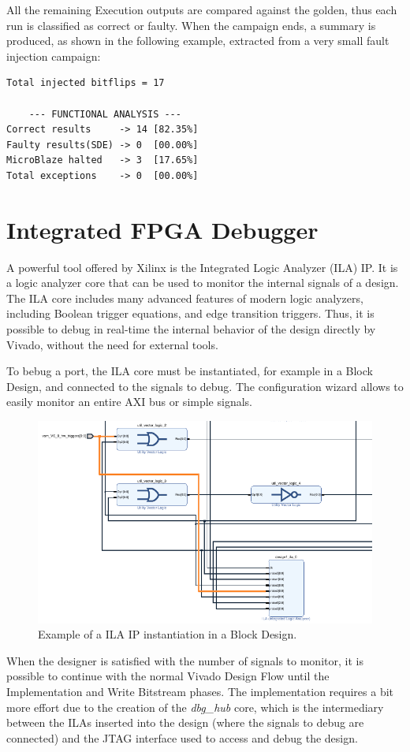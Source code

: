 All the remaining Execution outputs are compared against the golden, thus each run is classified as correct or faulty. When the campaign ends, a summary is produced, as shown in the following example, extracted from a very small fault injection campaign:\bigskip

\begin{lstlisting}[style=preformatted]
Total injected bitflips = 17

    --- FUNCTIONAL ANALYSIS ---
Correct results     -> 14 [82.35%]
Faulty results(SDE) -> 0  [00.00%]
MicroBlaze halted   -> 3  [17.65%]
Total exceptions    -> 0  [00.00%]
\end{lstlisting}

\section{Integrated FPGA Debugger}
\label{sec:ila}

A powerful tool offered by Xilinx is the Integrated Logic Analyzer (ILA) IP. It is a logic analyzer core that can be used to monitor the internal signals of a design. The ILA core includes many advanced features of modern logic analyzers, including Boolean trigger equations, and edge transition triggers. Thus, it is possible to debug in real-time the internal behavior of the design directly by Vivado, without the need for external tools.\bigskip

To bebug a port, the ILA core must be instantiated, for example in a Block Design, and connected to the signals to debug. The configuration wizard allows to easily monitor an entire AXI bus or simple signals. 

\begin{figure}[H]
\centering
\includegraphics[width=0.65\linewidth]{images/chapter3/ila_inst_example_cropped_again_andagain.pdf}
\caption{Example of a ILA IP instantiation in a Block Design.}
\end{figure}

When the designer is satisfied with the number of signals to monitor, it is possible to continue with the normal Vivado Design Flow until the Implementation and Write Bitstream phases. The implementation requires a bit more effort due to the creation of the \textit{dbg_hub} core, which is the intermediary between the ILAs inserted into the design (where the signals to debug are connected) and the JTAG interface used to access and debug the design.\bigskip

